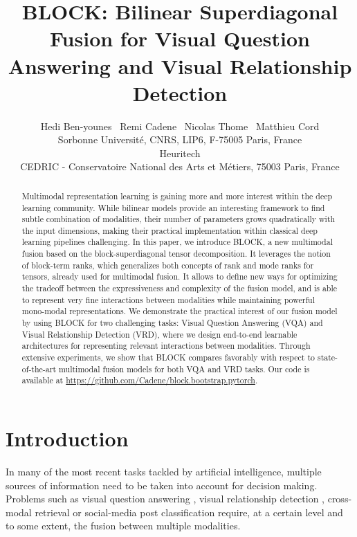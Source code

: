 \documentclass[letterpaper]{article} \usepackage{aaai19}  \usepackage{times}  \usepackage{helvet}  \usepackage{courier}  \usepackage{url}  \usepackage{graphicx}  \usepackage{booktabs}       \usepackage{comment}
\begin{document}
\title{BLOCK: Bilinear Superdiagonal Fusion for Visual Question Answering and Visual Relationship Detection}

\author{Hedi Ben-younes \ Remi Cadene \ Nicolas Thome \ Matthieu Cord \\
Sorbonne Universit\'e, CNRS, LIP6, F-75005 Paris, France \\ Heuritech \\
CEDRIC - Conservatoire National des Arts et M\'etiers, 75003 Paris,
France
}

\maketitle
\begin{abstract}
 Multimodal representation learning is gaining more and more interest within the deep learning community. While bilinear models provide an interesting framework to find subtle combination of modalities, their number of parameters grows quadratically with the input dimensions, making their practical implementation within classical deep learning pipelines challenging. 
 In this paper, we introduce BLOCK, a new multimodal fusion based on the block-superdiagonal tensor decomposition. It leverages the notion of block-term ranks, which generalizes both concepts of rank and mode ranks for tensors, already used for multimodal fusion. 
 It allows to define new ways for optimizing the tradeoff between the expressiveness and complexity of the fusion model, and is able to represent very fine interactions between modalities while maintaining powerful mono-modal representations. 
 We demonstrate the practical interest of our fusion model by using BLOCK for two challenging tasks: Visual Question Answering (VQA) and Visual Relationship Detection (VRD), where we design end-to-end learnable architectures for representing relevant interactions between modalities.
 Through extensive experiments, we show that BLOCK compares favorably with respect to state-of-the-art multimodal fusion models for both VQA and VRD tasks. Our code is available at \url{https://github.com/Cadene/block.bootstrap.pytorch}.
 \end{abstract}

\section{Introduction}
In many of the most recent tasks tackled by artificial intelligence, multiple sources of information need to be taken into account for decision making. Problems such as visual question answering \cite{Goyal_2017_CVPR}, visual relationship detection \cite{VRD_Lu_2016_ECCV}, cross-modal retrieval \cite{kiros2015unifying} or social-media post classification \cite{Duong2017MultimodalCF} require, at a certain level and to some extent, the fusion between multiple modalities.
\end{document}
